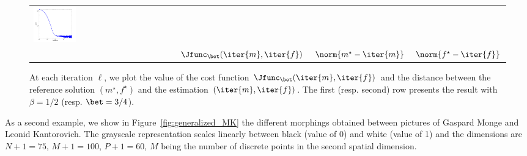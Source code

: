 \begin{figure}[!ht]
\begin{center}
\begin{tabular}{lccc}
\hspace{-0.5cm}
\includegraphics[trim=30 10 40 20,clip,width=0.31\textwidth]{images/Evol_f_beta_075}\vspace{0.1cm}\\
&\hspace{-0.3cm}$\Jfunc_\bet( \iter{m},\iter{f} )$&\hspace{-0.5cm}$\norm{m^\star-\iter{m}}$&\hspace{-0.5cm}$\norm{f^\star-\iter{f}}$ \vspace{-0.2cm}
\end{tabular}
\caption{\label{fig:evol_bump_beta} At each iteration $\ell$, we plot the value of the cost function $\Jfunc_\bet(\iter{m},\iter{f})$ and the distance between the reference solution $(m^\star,f^\star)$ and the estimation $(\iter{m},\iter{f})$. The first (resp. second) row presents the result with $\beta=1/2$ (resp. $\bet=3/4$).}
\end{center}
\end{figure}

As a second example, we show in Figure~\ref{fig:generalized_MK} the different morphings obtained between pictures of Gaspard Monge and Leonid Kantorovich. The grayscale representation scales linearly between black (value of 0) and white (value of 1)  and the dimensions are $N+1=75$, $M+1=100$, $P+1=60$, $M$ being the number of discrete points in the second spatial dimension.

